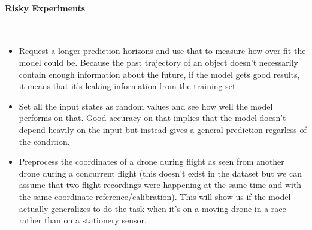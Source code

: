 \documentclass{article}
\begin{document}

\paragraph{Risky Experiments}$ $
\begin{itemize}
\item Request a longer prediction horizons and use that to measure how over-fit the model could be. Because the past trajectory of an object doesn't necessarily contain enough information about the future, if the model gets good results, it means that it's leaking information from the training set.
\item Set all the input states as random values and see how well the model performs on that. Good accuracy on that implies that the model doesn't depend heavily on the input but instead gives a general prediction regarless of the condition. 
\item Preprocess the coordinates of a drone during flight as seen from another drone during a concurrent flight (this doesn't exist in the dataset but we can assume that two flight recordings were happening at the same time and with the same coordinate reference/calibration). This will show us if the model actually generalizes to do the task when it's on a moving drone in a race rather than on a stationery sensor.
\end{itemize}





\end{document}
